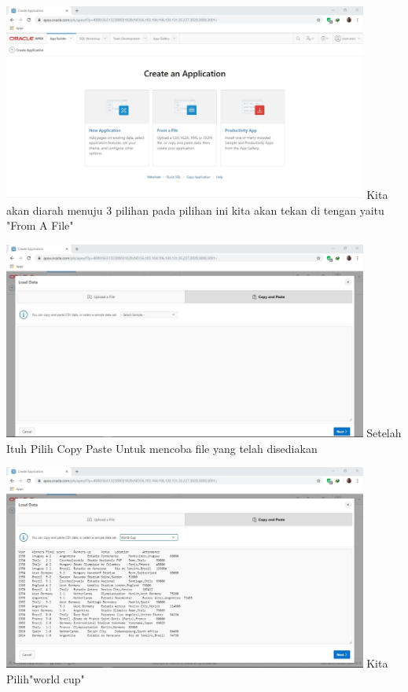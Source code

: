 \documentclass[12pt, times news roman, a4paper] {article}
\begin{document}
	\begin{minipage}{\linewidth}
	\centering
	\includegraphics[width=12cm]{Capture4.jpg} 
	 {Kita akan diarah menuju 3 pilihan pada pilihan ini kita akan tekan di tengan yaitu "From A File"}
\end{minipage}

	\begin{minipage}{\linewidth}
	\centering
	\includegraphics[width=12cm]{Capture5.jpg} 
	 {Setelah Ituh Pilih Copy Paste Untuk mencoba file yang telah disediakan}
\end{minipage}

	\begin{minipage}{\linewidth}
	\centering
	\includegraphics[width=12cm]{Capture6.jpg} 
	 {Kita Pilih"world cup" }
\end{minipage}
\end{document}
